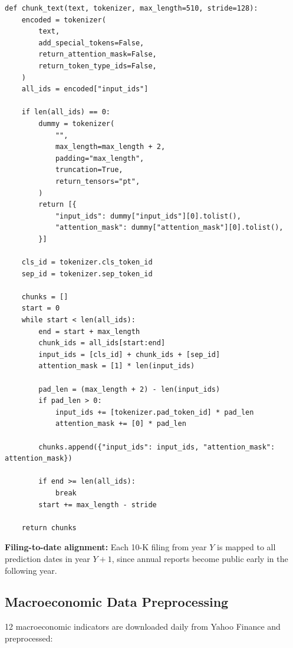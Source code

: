 \documentclass[12pt,a4paper]{article}
\begin{document}
\begin{lstlisting}[caption={Text chunking (src/data/preprocessing.py)}]
def chunk_text(text, tokenizer, max_length=510, stride=128):
    encoded = tokenizer(
        text,
        add_special_tokens=False,
        return_attention_mask=False,
        return_token_type_ids=False,
    )
    all_ids = encoded["input_ids"]

    if len(all_ids) == 0:
        dummy = tokenizer(
            "",
            max_length=max_length + 2,
            padding="max_length",
            truncation=True,
            return_tensors="pt",
        )
        return [{
            "input_ids": dummy["input_ids"][0].tolist(),
            "attention_mask": dummy["attention_mask"][0].tolist(),
        }]

    cls_id = tokenizer.cls_token_id
    sep_id = tokenizer.sep_token_id

    chunks = []
    start = 0
    while start < len(all_ids):
        end = start + max_length
        chunk_ids = all_ids[start:end]
        input_ids = [cls_id] + chunk_ids + [sep_id]
        attention_mask = [1] * len(input_ids)

        pad_len = (max_length + 2) - len(input_ids)
        if pad_len > 0:
            input_ids += [tokenizer.pad_token_id] * pad_len
            attention_mask += [0] * pad_len

        chunks.append({"input_ids": input_ids, "attention_mask": attention_mask})

        if end >= len(all_ids):
            break
        start += max_length - stride

    return chunks
\end{lstlisting}

\textbf{Filing-to-date alignment:} Each 10-K filing from year $Y$ is mapped to all prediction dates in year $Y+1$, since annual reports become public early in the following year.

\subsection{Macroeconomic Data Preprocessing}

12 macroeconomic indicators are downloaded daily from Yahoo Finance and preprocessed:
\end{document}
